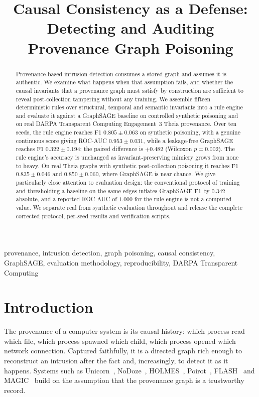 \documentclass[journal]{IEEEtran}
\begin{document}
\title{Causal Consistency as a Defense: Detecting and Auditing Provenance Graph Poisoning}

\author{
}

\maketitle

\begin{abstract}
Provenance-based intrusion detection consumes a stored graph and assumes it is
authentic. We examine what happens when that assumption fails, and whether the
causal invariants that a provenance graph must satisfy by construction are
sufficient to reveal post-collection tampering without any training. We assemble
fifteen deterministic rules over structural, temporal and semantic invariants
into a rule engine and evaluate it against a GraphSAGE baseline on controlled
synthetic poisoning and on real DARPA Transparent Computing Engagement~3 Theia
provenance. Over ten seeds, the rule engine reaches F1 $0.805\pm0.063$ on
synthetic poisoning, with a genuine continuous score giving ROC-AUC
$0.953\pm0.031$, while a leakage-free GraphSAGE reaches F1 $0.322\pm0.194$; the
paired difference is $+0.482$ (Wilcoxon $p=0.002$). The rule engine's accuracy is
unchanged as invariant-preserving mimicry grows from none to heavy. On real
Theia graphs with synthetic post-collection poisoning it reaches F1
$0.835\pm0.046$ and $0.850\pm0.060$, where GraphSAGE is near chance. We give
particularly close attention to evaluation design: the conventional protocol of
training and thresholding a baseline on the same edges inflates GraphSAGE F1 by
$0.342$ absolute, and a reported ROC-AUC of $1.000$ for the rule engine is not a
computed value. We separate real from synthetic evaluation throughout and release
the complete corrected protocol, per-seed results and verification scripts.
\end{abstract}

\begin{IEEEkeywords}
provenance, intrusion detection, graph poisoning, causal consistency,
GraphSAGE, evaluation methodology, reproducibility, DARPA Transparent Computing
\end{IEEEkeywords}

\section{Introduction}
The provenance of a computer system is its causal history: which process read
which file, which process spawned which child, which process opened which
network connection. Captured faithfully, it is a directed graph rich enough to
reconstruct an intrusion after the fact and, increasingly, to detect it as it
happens. Systems such as Unicorn~\cite{han2020unicorn}, NoDoze~\cite{hasan2021nodoze},
HOLMES~\cite{milajerdi2019holmes}, Poirot~\cite{peirce2021poirot},
FLASH~\cite{chen2021flash} and MAGIC~\cite{li2021magnet} build on the assumption
that the provenance graph is a trustworthy record.
\end{document}
